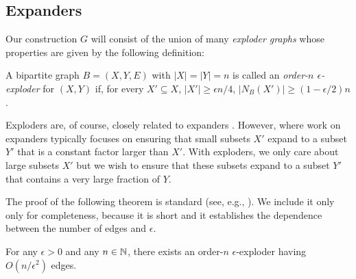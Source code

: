 \documentclass{patmorin}
\begin{document}
\subsection{Expanders}

Our construction $G$ will consist of the union of many \emph{exploder
graphs} whose properties are given by the following definition:

\begin{defn}
   A bipartite graph $B=(X,Y,E)$ with $|X|=|Y|=n$ is called an
   \emph{order-$n$ $\epsilon$-exploder} for $(X,Y)$ if, for
   every $X'\subseteq X$, $|X'|\ge \epsilon n/4$, $|N_B(X')| \ge
   (1-\epsilon/2)n$.
\end{defn}

Exploders are, of course, closely related to expanders \cite{hoory.linial.wigderson:expanders}.  However, where work on expanders typically focuses on ensuring that small subsets $X'$ expand to a subset $Y'$ that is a constant factor larger than $X'$.  With exploders, we only care about large subsets $X'$ but we wish to ensure that these subsets expand to a subset $Y'$ that contains a very large fraction of $Y$.

The proof of the following theorem is standard (see, e.g.,
\cite[Lemma~1.9]{hoory.linial.wigderson:expanders}).  We include it
only only for completeness, because it is short and it establishes the
dependence between the number of edges and $\epsilon$.

\begin{thm}
   For any $\epsilon >0$ and any $n\in\mathbb{N}$, there exists
   an order-$n$ $\epsilon$-exploder having $O(n/\epsilon^2)$ edges.
\end{thm}
\end{document}

